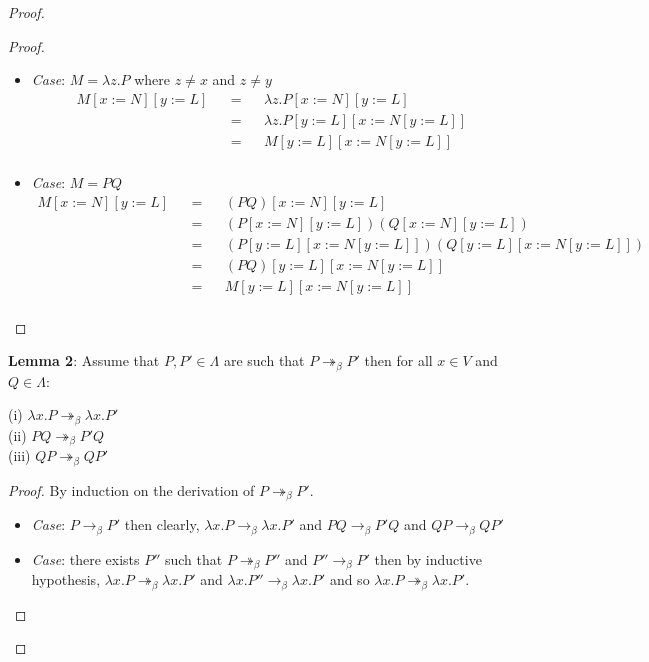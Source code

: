 \documentclass[12pt]{article}
\begin{document}
\begin{proof}
\begin{proof}
\begin{itemize}
\item \textsl{Case}: $M=\lambda z.P$ where $z \neq x$ and $z \neq y$
\begin{align*}
    M[x:=N][y:=L] &&=&& \lambda z.P[x:=N][y:=L] \\
    &&=&& \lambda z.P[y:=L][x:=N[y:=L]] \\
    &&=&& M[y:=L][x:=N[y:=L]] \\
\end{align*}

\item \textsl{Case}: $M = P Q$
\begin{align*}
    M[x:=N][y:=L] &&=&& (P Q)[x:=N][y:=L] \\
    &&=&& (P[x:=N][y:=L]) (Q[x:=N][y:=L]) \\
    &&=&& (P[y:=L][x:=N[y:=L]]) (Q[y:=L][x:=N[y:=L]]) \\
    &&=&& (P Q)[y:=L][x:=N[y:=L]] \\
    &&=&& M[y:=L][x:=N[y:=L]] \\
\end{align*}
\end{itemize}
\end{proof}

\textbf{Lemma 2}: Assume that $P, P' \in \Lambda$ are such that $P \twoheadrightarrow_{\beta} P'$ then for all $x \in V$ and $Q \in \Lambda$:

(i) $\lambda x.P \twoheadrightarrow_{\beta} \lambda x.P'$ \\
(ii) $P Q \twoheadrightarrow_{\beta} P' Q$ \\
(iii) $Q P \twoheadrightarrow_{\beta} Q P'$ \\

\begin{proof}
By induction on the derivation of $P \twoheadrightarrow_{\beta} P'$.

\begin{itemize}
\item \textsl{Case}: $P \rightarrow_{\beta} P'$ then clearly, $\lambda x.P \rightarrow_{\beta} \lambda x.P'$  and $P Q \rightarrow_{\beta} P' Q$ and $Q P \rightarrow_{\beta} Q P'$ \\

\item \textsl{Case}: there exists $P''$ such that $P \twoheadrightarrow_{\beta} P''$ and $P'' \rightarrow_{\beta} P'$ then by inductive hypothesis, $\lambda x.P \twoheadrightarrow_{\beta} \lambda x.P'$ and $\lambda x.P'' \rightarrow_{\beta} \lambda x.P'$  and so $\lambda x.P \twoheadrightarrow_{\beta} \lambda x.P'$. 


\end{itemize}
\end{proof}
\end{proof}
\end{document}
